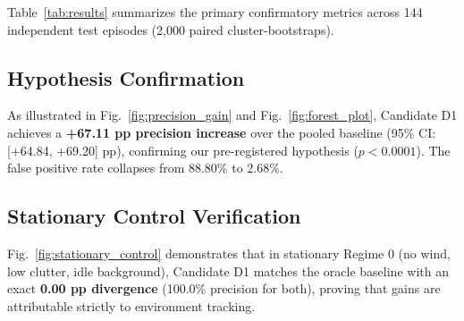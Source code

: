 \documentclass[conference]{IEEEtran}
\begin{document}
\begin{table}[t]
\centering
\caption{Confirmatory Empirical Results Across Detectors on 7,200 Pristine Test Frames}
\label{tab:results}
\end{table}

Table~\ref{tab:results} summarizes the primary confirmatory metrics across 144 independent test episodes (2,000 paired cluster-bootstraps). 

\subsection{Hypothesis Confirmation}
As illustrated in Fig.~\ref{fig:precision_gain} and Fig.~\ref{fig:forest_plot}, Candidate D1 achieves a \textbf{+67.11 pp precision increase} over the pooled baseline (95\% CI: [+64.84, +69.20] pp), confirming our pre-registered hypothesis ($p < 0.0001$). The false positive rate collapses from 88.80\% to 2.68\%.

\subsection{Stationary Control Verification}
Fig.~\ref{fig:stationary_control} demonstrates that in stationary Regime 0 (no wind, low clutter, idle background), Candidate D1 matches the oracle baseline with an exact \textbf{0.00 pp divergence} (100.0\% precision for both), proving that gains are attributable strictly to environment tracking.
\end{document}

